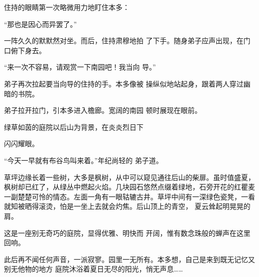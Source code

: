 \documentclass{article}
\begin{document}
住持的眼睛第一次略微用力地盯住本多： 


“那也是因心而异罢了。” 

一阵久久的默默然对坐。而后，住持肃穆地拍
了下手。随身弟子应声出现，在门口俯下身去。 

“来一次不容易，请观赏一下南园吧！我当向
导。” 

弟子再次拉起要当向导的住持的手。本多像被
操纵似地站起身，跟着两人穿过幽暗的书院。 

弟子拉开拉门，引本多进入檐廊。宽阔的南园
顿时展现在眼前。 

绿草如茵的庭院以后山为背景，在炎炎烈日下
\newpage

闪闪耀眼。 

“今天一早就有布谷鸟叫来着。”年纪尚轻的
弟子道。 

草坪边缘长着一些树，大多是枫树，从中可以窥见通往后山的柴扉。虽时值盛夏，枫树却已红了，从绿丛中燃起火焰。几块园石悠然点缀着绿地，石旁开花的红瞿麦一副楚楚可怜的情态。左面一角有一眼轱辘古井。草坪中间有一深绿色瓷凳，一看就知被晒得滚烫，怕是一坐上去就会灼焦。后山顶上的青空，
夏云耸起明晃晃的肩。 

这是一座别无奇巧的庭院，显得优雅、明快而
开阔，惟有数念珠般的蝉声在这里回响。 

此后再不闻任何声音，一派寂寥。园里一无所有。本多想，自己是来到既无记忆又别无他物的地方
庭院沐浴着夏日无尽的阳光，悄无声息……
\end{document}
